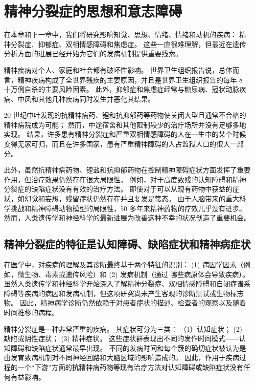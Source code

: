 \chapter{精神分裂症的思想和意志障碍} \label{chap:chap60}

在本章和下一章中，我们将研究影响知觉、思想、情绪、情绪和动机的疾病：
精神分裂症、抑郁症、双相情感障碍和焦虑症。
这些一直很难理解，但最近在遗传分析方面的进展已经开始为它们的发病机制提供重要线索。


精神疾病对个人、家庭和社会都有破坏性影响。
世界卫生组织报告说，总体而言，精神疾病构成了全世界残疾的主要原因，并且是世界卫生组织报告的每年 8 十万例自杀的主要风险因素。
此外，抑郁症和焦虑症经常与糖尿病、冠状动脉疾病、中风和其他几种疾病同时发生并恶化其结果。


20 世纪中叶发现的抗精神病药、锂和抗抑郁药等药物使关闭大型且通常不合格的精神病院成为可能；
然而，中途宿舍和其他限制较少的治疗场所并没有足够多地实现。
结果，许多患有精神分裂症和严重双相情感障碍的人在一生中的某个时候变得无家可归，而且在许多国家，患有严重精神障碍的人占监狱人口的很大一部分。


此外，虽然抗精神病药物、锂盐和抗抑郁药物在控制精神障碍症状方面发挥了重要作用，但治疗效果仍然存在很大局限性。
例如，对于高度致残的认知障碍和精神分裂症的缺陷症状没有有效的治疗方法。
即使对于可以从现有药物中获益的症状，如幻觉和妄想，残留症状仍然存在并且复发是常态。
由于人脑带来的重大科学挑战和精神障碍动物模型的局限性，50 多年来精神药物的疗效几乎没有进步。
然而，人类遗传学和神经科学的最新进展为改善这种不幸的状况创造了重要机会。



\section{精神分裂症的特征是认知障碍、缺陷症状和精神病症状}

在医学中，对疾病的理解及其诊断最终基于两个特征的识别：
(1) 病因学因素（例如，微生物、毒素或遗传风险）和 
(2) 发病机制（通过 哪些病原体会导致疾病）。
虽然人类遗传学和神经科学开始深入了解精神分裂症、双相情感障碍和自闭症谱系障碍等疾病的病因和发病机制，但这项研究尚未产生客观的诊断测试或生物标志物。
因此，精神病学诊断仍然依赖于对患者症状的描述、检查者的观察以及随着时间推移的病程。


精神分裂症是一种非常严重的疾病。
其症状可分为三类：
（1）认知症状； 
(2) 缺陷或阴性症状； 
(3) 精神症状。
这些症状群表现出不同的发作时间模式——认知障碍和缺陷症状通常最早出现。
不同的发病时间和每个簇的确切症状被认为是由发育致病机制对不同神经回路和大脑区域的影响造成的。
因此，作用于疾病过程的一个“下游”方面的抗精神病药物等现有治疗方法对认知障碍或缺陷症状没有任何有益影响。


